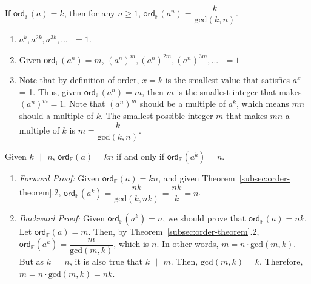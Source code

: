 \begin{tcolorbox}[title={\textbf{\tboxtheorem{\ref*{subsec:order-theorem}.2} Order Property (II)}}]
If $\textsf{ord}_{\mathbb{F}}(a) = k$, then for any $n \geq 1$, $\textsf{ord}_{\mathbb{F}}(a^n) = \dfrac{k} {\text{gcd}(k, n)}$.
\end{tcolorbox}
\begin{myproof}
    \begin{enumerate}
    \item $a^k, a^{2k}, a^{3k}, ... \text{ } = 1$. 
    \item Given $\textsf{ord}_{\mathbb{F}}(a^n) = m$, $(a^n)^m, (a^n)^{2m}, (a^n)^{3m}, ... \text{ } = 1$ 
    \item Note that by definition of order, $x=k$ is the smallest value that satisfies $a^x$ = 1. Thus, given $\textsf{ord}_{\mathbb{F}}(a^n) = m$, then $m$ is the smallest integer that makes $(a^n)^m = 1$. Note that $(a^n)^m$ should be a multiple of $a^k$, which means $mn$ should a multiple of $k$. The smallest possible integer $m$ that makes $mn$ a multiple of $k$ is $m = \dfrac{k}{\text{gcd}(k, n)}$. 
    \end{enumerate}
\end{myproof}

\begin{tcolorbox}[title={\textbf{\tboxtheorem{\ref*{subsec:order-theorem}.3} Order Property (III)}}]
Given $k \text{ } | \text{ } n$, $\textsf{ord}_{\mathbb{F}}(a) = kn$ if and only if $\textsf{ord}_{\mathbb{F}}(a^k) = n$.
\end{tcolorbox}
\begin{myproof}
\begin{enumerate}
    \item \textit{Forward Proof:} Given $\textsf{ord}_{\mathbb{F}}(a) = kn$, and given Theorem~\ref*{subsec:order-theorem}.2, $\textsf{ord}_{\mathbb{F}}(a^k) = \dfrac{nk}{\text{gcd}(k, nk)} = \dfrac{nk}{k} = n$.
    \item \textit{Backward Proof:} Given $\textsf{ord}_{\mathbb{F}}(a^k) = n$, we should prove that $\textsf{ord}_{\mathbb{F}}(a) = nk$. Let $\textsf{ord}_{\mathbb{F}}(a) = m$. Then, by Theorem~\ref*{subsec:order-theorem}.2, $\textsf{ord}_{\mathbb{F}}(a^k) = \dfrac{m}{\text{gcd}(m, k)}$, which is $n$. In other words, $m = n \cdot \text{gcd}(m, k)$. But as $k \text{ } | \text{ } n$, it is also true that $k \text{ } | \text{ } m$. Then, $\text{gcd}(m, k) = k$. Therefore, $m = n \cdot \text{gcd}(m, k) = nk$.
\end{enumerate}
\end{myproof}

